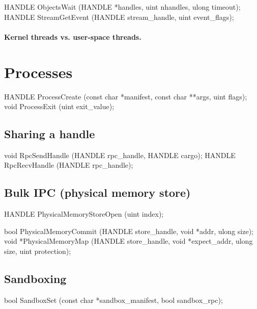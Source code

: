\begin{paldef}
HANDLE ObjectsWait    (HANDLE *handles, uint nhandles,
                       ulong timeout);
HANDLE StreamGetEvent (HANDLE stream_handle,
                       uint event_flags);
\end{paldef}



\paragraph{Kernel threads vs. user-space threads.}



\section{Processes}
\label{sec:abi:proc}



\begin{paldef}
HANDLE ProcessCreate (const char *manifest,
                      const char **args, uint flags);
void ProcessExit (uint exit_value);
\end{paldef}



\subsection*{Sharing a handle}


\begin{paldef}
void   RpcSendHandle (HANDLE rpc_handle, HANDLE cargo);
HANDLE RpcRecvHandle (HANDLE rpc_handle);
\end{paldef}



\subsection*{Bulk IPC (physical memory store)}


\begin{paldef}
HANDLE PhysicalMemoryStoreOpen (uint index);
\end{paldef}



\begin{paldef}
bool  PhysicalMemoryCommit (HANDLE store_handle,
                            void *addr, ulong size);
void *PhysicalMemoryMap (HANDLE store_handle,
                         void *expect_addr, ulong size,
                         uint protection);
\end{paldef}


\subsection*{Sandboxing}


\begin{paldef}
bool SandboxSet (const char *sandbox_manifest,
                 bool sandbox_rpc);
\end{paldef}